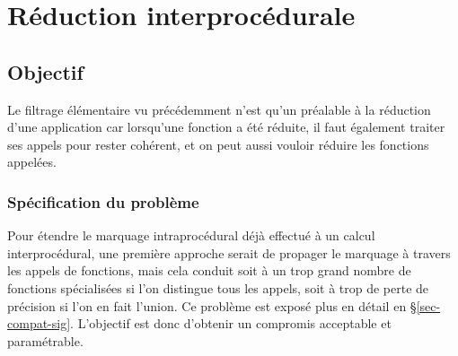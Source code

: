 \newcommand{\bb}{\bigskip}

\newcommand{\spare}{\ensuremath{\mathit{Spare}}}
\newcommand{\sigc}{\ensuremath{\mathit{sig_c}}}
\newcommand{\insigc}{\ensuremath{\mathit{inSig_c}}}
\newcommand{\outsigc}{\ensuremath{\mathit{outSig_c}}}
\newcommand{\sigf}{\ensuremath{\mathit{sig_f}}}
\newcommand{\insigf}{\ensuremath{\mathit{inSig_f}}}
\newcommand{\outsigf}{\ensuremath{\mathit{outSig_f}}}
\newcommand{\sig}{\ensuremath{\mathit{sig}}}
\newcommand{\true}{\ensuremath{\mathit{true}}}
\newcommand{\false}{\ensuremath{\mathit{false}}}
 
\newcommand{\imply}{\Rightarrow}
\newcommand{\lt}{<}
 
\newcommand{\inout}{\ensuremath{\mathit{InOut}}}
\newcommand{\call}{\ensuremath{\mathit{call}}}
\newcommand{\length}{\ensuremath{\mathit{length}}}
\newcommand{\none}{\ensuremath{\mathit{None}}}
 
 
\newcommand{\topm}{{\top}_m}
\newcommand{\tops}{{\top}_s}
\newcommand{\topc}{{\top}_c}
\newcommand{\botm}{{\bot}_m}
\newcommand{\bots}{{\bot}_s}
\newcommand{\botc}{{\bot}_c}
 
\newcommand{\option}[1]{\motcle{#1}{Options}{opt}{\textbf{#1}}}

\newcommand{\defaction}[1]{\motcle{#1}{Actions}{act}}
\newcommand{\labact}[2]{\index{Actions!#1}\label{sec-#1-#2}}
\newcommand{\refact}[2]{\S\ref{sec-#1-#2}}

\chapter{Réduction interprocédurale}\label{sec-interproc}

\section{Objectif}

Le filtrage élémentaire vu précédemment n'est qu'un préalable à la réduction
d'une application car lorsqu'une fonction a été réduite, il faut également
traiter ses appels pour rester cohérent, et on peut aussi vouloir réduire les
fonctions appelées.

\subsection{Spécification du problème}

Pour étendre le marquage intraprocédural
déjà effectué à un calcul interprocédural,
une première approche serait
de propager le marquage à travers les appels de fonctions, mais cela conduit
soit à un trop grand nombre de fonctions spécialisées si l'on distingue tous les
appels, soit à trop de perte de précision si l'on en fait l'union.
Ce problème est exposé plus en détail en \S\ref{sec-compat-sig}.
L'objectif est donc d'obtenir un compromis acceptable et paramétrable.\\

